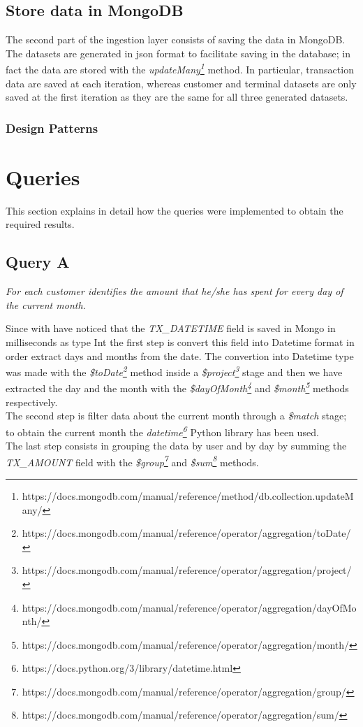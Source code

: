 \documentclass[runningheads]{llncs}
\begin{document}
\subsection{Store data in MongoDB}

The second part of the ingestion layer consists of saving the data in MongoDB. The datasets are generated in json format to facilitate saving in the database; in fact the data are stored with the \emph{updateMany\footnote{https://docs.mongodb.com/manual/reference/method/db.collection.updateMany/}} method. In particular, transaction data are saved at each iteration, whereas customer and terminal datasets are only saved at the first iteration as they are the same for all three generated datasets.

\subsubsection{Design Patterns}

\section{Queries}

This section explains in detail how the queries were implemented to obtain the required results.

\subsection{Query A}

\emph{For each customer identifies the amount that he/she has spent for every day of the current month.}

\hfill

\noindent
Since with have noticed that the \emph{TX\_DATETIME} field is saved in Mongo in milliseconds as type Int the first step is convert this field into Datetime format in order extract days and months from the date. The  convertion into Datetime type was made with the \emph{\$toDate\footnote{https://docs.mongodb.com/manual/reference/operator/aggregation/toDate/}} method inside a \emph{\$project\footnote{https://docs.mongodb.com/manual/reference/operator/aggregation/project/}} stage and then we have extracted the day and the month with the \emph{\$dayOfMonth\footnote{https://docs.mongodb.com/manual/reference/operator/aggregation/dayOfMonth/}} and \emph{\$month\footnote{https://docs.mongodb.com/manual/reference/operator/aggregation/month/}} methods respectively.\\
The second step is filter data about the current month through a \emph{\$match} stage; to obtain the current month the \emph{datetime\footnote{https://docs.python.org/3/library/datetime.html}} Python library has been used.\\
The last step consists in grouping the data by user and by day by summing the \emph{TX\_AMOUNT} field with the \emph{\$group\footnote{https://docs.mongodb.com/manual/reference/operator/aggregation/group/}} and \emph{\$sum\footnote{https://docs.mongodb.com/manual/reference/operator/aggregation/sum/}} methods.
\end{document}
